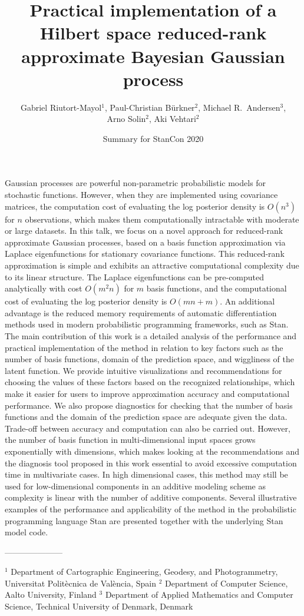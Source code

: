 \documentclass[onecolumn,a4paper,11pt]{article}
\title{Practical implementation of a Hilbert space reduced-rank approximate Bayesian Gaussian process}
\author{Gabriel Riutort-Mayol$^{1}$, Paul-Christian Bürkner$^2$, Michael R.\ Andersen$^{3}$,\\
  Arno Solin$^{2}$, Aki Vehtari$^{2}$}
\date{\small Summary for StanCon 2020}
\begin{document}
\maketitle


Gaussian processes are powerful non-parametric probabilistic models for stochastic functions. However, when they are implemented using covariance matrices, the computation cost of evaluating the log posterior density is $O(n^3)$ for $n$ observations, which makes them computationally intractable with moderate or large datasets. In this talk, we focus on a novel approach for reduced-rank approximate Gaussian processes, based on a basis function approximation via Laplace eigenfunctions for stationary covariance functions. This reduced-rank approximation is simple and exhibits an attractive computational complexity due to its linear structure. The Laplace eigenfunctions can be pre-computed analytically with cost $O(m^2n)$ for $m$ basis functions, and the computational cost of evaluating the log posterior density is $O(mn + m)$. An additional advantage is the reduced memory requirements of automatic differentiation methods used in modern probabilistic programming frameworks, such as Stan. The main contribution of this work is a detailed analysis of the performance and practical implementation of the method in relation to key factors such as the number of basis functions, domain of the prediction space, and wiggliness of the latent function. We provide intuitive visualizations and recommendations for choosing the values of these factors based on the recognized relationships, which make it easier for users to improve approximation accuracy and computational performance. We also propose diagnostics for checking that the number of basis functions and the domain of the prediction space are adequate given the data.  Trade-off between accuracy and computation can also be carried out. However, the number of basis function in multi-dimensional input spaces grows exponentially with dimensions, which makes looking at the recommendations and the diagnosis tool proposed in this work essential to avoid excessive computation time in multivariate cases. In high dimensional cases, this method may still be used for low-dimensional components in an additive modeling scheme as complexity is linear with the number of additive components. Several illustrative examples of the performance and applicability of the method in the probabilistic programming language Stan are presented together with the underlying Stan model code.

---------------------
\vspace{-2mm}
\begin{flushleft}
\scriptsize
$^1$ Department of Cartographic Engineering, Geodesy, and Photogrammetry, Universitat Polit\`ecnica de Val\`encia, Spain 
\break
$^2$ Department of Computer Science, Aalto University, Finland
\break
$^3$ Department of Applied Mathematics and Computer Science, Technical University of Denmark, Denmark
\end{flushleft}


%
\end{document}
